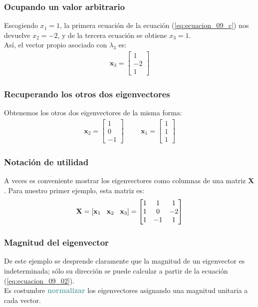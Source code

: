 \documentclass[12pt]{beamer}
\begin{document}
\begin{frame}
\frametitle{Ocupando un valor arbitrario}
Escogiendo $x_{1} = 1$, la primera ecuación de la ecuación (\ref{eq:ecuacion_09_c}) nos devuelve $x_{2} = -2$, y de la tercera ecuación se obtiene $x_{3} = 1$. 
\\
\bigskip
\pause
Así, el vector propio asociado con $\lambda_{3}$ es:
\pause
\begin{align*}
\mathbf{x}_{3}  = \begin{bmatrix}
1 \\
-2 \\
1
\end{bmatrix}
\end{align*}
\end{frame}
\begin{frame}
\frametitle{Recuperando los otros dos eigenvectores}
Obtenemos los otros dos eigenvectores de la misma forma:
\pause
\begin{align*}
\mathbf{x}_{2} = \begin{bmatrix}
1 \\
0 \\
-1
\end{bmatrix} \hspace{1cm}
\mathbf{x}_{1} =  \begin{bmatrix}
1 \\
1 \\
1
\end{bmatrix}
\end{align*}
\end{frame}
\begin{frame}
\frametitle{Notación de utilidad}
A veces es conveniente mostrar los eigenvectores como columnas de una matriz $\mathbf{X}$. \pause Para nuestro primer ejemplo, esta matriz es:
\pause
\begin{align*}
\mathbf{X} = \left[ \mathbf{x}_{1} \hspace{0.3cm} \mathbf{x}_{2} \hspace{0.3cm} \mathbf{x}_{3} \right] = 
\begin{bmatrix}
1 & 1 & 1 \\
1 & 0 & -2 \\
1 & -1 & 1
\end{bmatrix}
\end{align*}
\end{frame}
\begin{frame}
\frametitle{Magnitud del eigenvector}
De este ejemplo se desprende claramente que la magnitud de un eigenvector es indeterminada; sólo su dirección se puede calcular a partir de la ecuación (\ref{eq:ecuacion_09_02}).
\\
\bigskip
\pause
Es costumbre \textbf{\textcolor{cadetblue}{normalizar}} los eigenvectores asignando una magnitud unitaria a cada vector. 
\end{frame}
\end{document}

